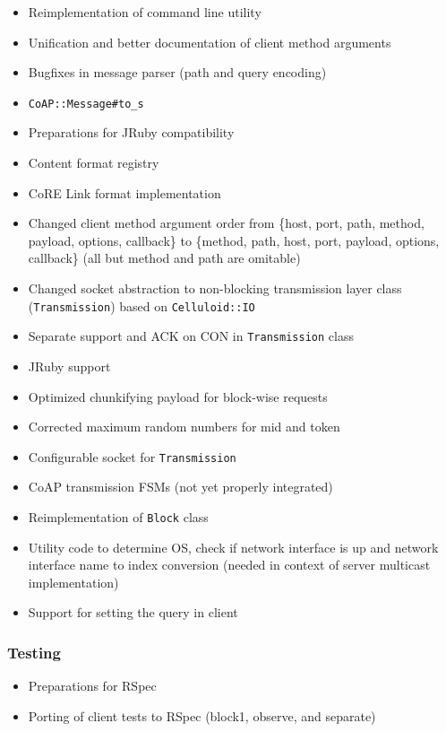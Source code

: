 \begin{multicols}{2}
			\begin{itemize}
				\item Reimplementation of command line utility
				\item Unification and better documentation of client method
					arguments
				\item Bugfixes in message parser (path and query encoding)
				\item \texttt{\ac{CoAP}::Message\#to\_s}
				\item Preparations for JRuby compatibility
				\item Content format registry
				\item \ac{CoRE} Link format \cite{link} implementation
				\item Changed client method argument order from \{host, port,
					path, method, payload, options, callback\} to \{method,
					path, host, port, payload, options, callback\} (all but
					method and path are omitable)
				\item Changed socket abstraction to non-blocking transmission
					layer class (\texttt{Transmission}) based on
					\texttt{Celluloid::IO}
				\item Separate support and ACK on CON in
					\texttt{Transmission} class
				\item JRuby support
				\item Optimized chunkifying payload for block-wise requests
				\item Corrected maximum random numbers for mid and token
				\item Configurable socket for \texttt{Transmission}
				\item \ac{CoAP} transmission \acp{FSM} (not yet properly
					integrated)
				\item Reimplementation of \texttt{Block} class
				\item Utility code to determine \acl{OS}, check if network
					interface is up and network interface name to index
					conversion (needed in context of server multicast
					implementation)
				\item Support for setting the query in client
			\end{itemize}

		\subsubsection{Testing}

			\begin{itemize}
				\item Preparations for RSpec \cite{rspec}
				\item Porting of client tests to RSpec (block1, observe, and
					separate)
			\end{itemize}
	\end{multicols}

